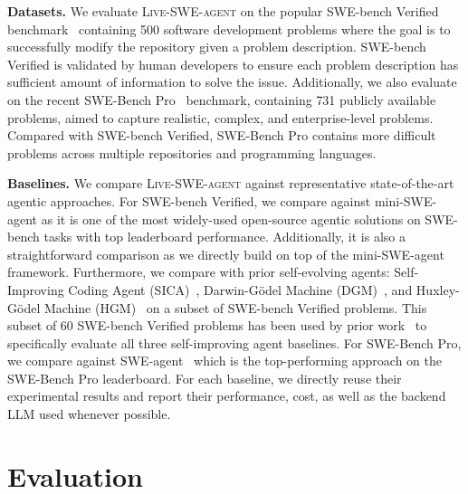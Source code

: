 \documentclass{article}
\newcommand{\tech}{\textsc{Live-SWE-agent}\xspace}
\newcommand{\sweagent}{SWE-agent\xspace}
\newcommand{\minisweagent}{mini-SWE-agent\xspace}
\newcommand{\swebench}{SWE-bench\xspace}
\newcommand{\swebenchpro}{SWE-Bench Pro\xspace}
\newcommand{\llm}{LLM\xspace}
\newcommand{\parabf}[1]{\vspace{.03in}\noindent \textbf{#1}}
\begin{document}
\parabf{Datasets.}
We evaluate \tech on the popular \swebench Verified benchmark~\citep{sbv} containing 500 software development problems where the goal is to successfully modify the repository given a problem description. 
\swebench Verified is validated by human developers to ensure each problem description has sufficient amount of information to solve the issue.
Additionally, we also evaluate on the recent \swebenchpro~\citep{deng2025swe} benchmark, containing 731 publicly available problems, aimed to capture realistic, complex, and enterprise-level problems. 
Compared with \swebench Verified, \swebenchpro contains more difficult problems across multiple repositories and programming languages.

\parabf{Baselines.}
We compare \tech against representative state-of-the-art agentic approaches. 
For \swebench Verified, we compare against \minisweagent as it is one of the most widely-used open-source agentic solutions on \swebench tasks with top leaderboard performance.
Additionally, it is also a straightforward comparison as we directly build on top of the \minisweagent framework.
Furthermore, we compare with prior self-evolving agents: Self-Improving Coding Agent (SICA)~\citep{robeyns2025sica}, Darwin-Gödel Machine (DGM)~\citep{zhang2025darwin}, and Huxley-Gödel Machine (HGM)~\citep{wang2025huxley} on a subset of \swebench Verified problems. 
This subset of 60 \swebench Verified problems has been used by prior work~\citep{wang2025huxley} to specifically evaluate all three self-improving agent baselines.
For \swebenchpro, we compare against \sweagent~\citep{yang2024sweagent} which is the top-performing approach on the \swebenchpro leaderboard.
For each baseline, we directly reuse their experimental results and report their performance, cost, as well as the backend \llm used whenever possible.


\section{Evaluation}
\end{document}
